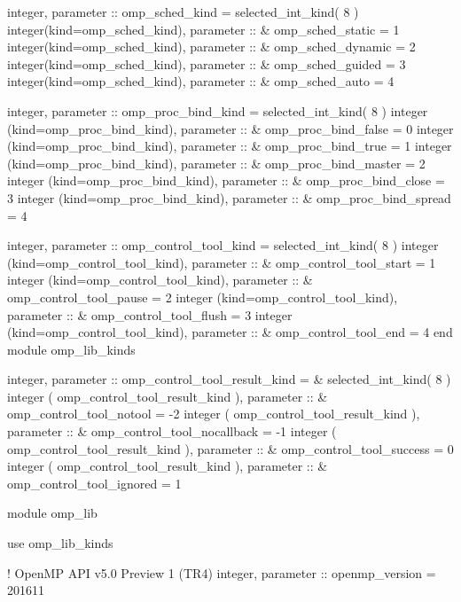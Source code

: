 {{\begin{codepar}
        integer, parameter :: omp\_sched\_kind = selected\_int\_kind( 8 ) 
        integer(kind=omp\_sched\_kind), parameter ::
      \&   omp\_sched\_static = 1
        integer(kind=omp\_sched\_kind), parameter ::
      \&   omp\_sched\_dynamic = 2
        integer(kind=omp\_sched\_kind), parameter ::
      \&   omp\_sched\_guided = 3
        integer(kind=omp\_sched\_kind), parameter ::
      \&   omp\_sched\_auto = 4
      
        integer, parameter :: omp\_proc\_bind\_kind = selected\_int\_kind( 8 )
        integer (kind=omp\_proc\_bind\_kind), parameter ::
      \&   omp\_proc\_bind\_false = 0
        integer (kind=omp\_proc\_bind\_kind), parameter ::
      \&   omp\_proc\_bind\_true = 1
        integer (kind=omp\_proc\_bind\_kind), parameter ::
      \&   omp\_proc\_bind\_master = 2
        integer (kind=omp\_proc\_bind\_kind), parameter ::
      \&   omp\_proc\_bind\_close = 3
        integer (kind=omp\_proc\_bind\_kind), parameter ::
      \&   omp\_proc\_bind\_spread = 4
\begin{samepage}
        integer, parameter :: omp\_control\_tool\_kind = selected\_int\_kind( 8 )
        integer (kind=omp\_control\_tool\_kind), parameter :: 
      \&   omp\_control\_tool\_start = 1
        integer (kind=omp\_control\_tool\_kind), parameter :: 
      \&   omp\_control\_tool\_pause = 2
        integer (kind=omp\_control\_tool\_kind), parameter :: 
      \&   omp\_control\_tool\_flush = 3
        integer (kind=omp\_control\_tool\_kind), parameter :: 
      \&   omp\_control\_tool\_end = 4
        end module omp\_lib\_kinds
\end{samepage}
\begin{samepage}
        integer, parameter :: omp\_control\_tool\_result\_kind = 
      \&   selected\_int\_kind( 8 )
        integer ( omp\_control\_tool\_result\_kind ), parameter :: 
      \&   omp_control_tool_notool = -2 
        integer ( omp\_control\_tool\_result\_kind ), parameter ::
      \&   omp_control_tool_nocallback = -1
        integer ( omp\_control\_tool\_result\_kind ), parameter ::
      \&   omp_control_tool_success = 0
        integer ( omp\_control\_tool\_result\_kind ), parameter ::
      \&   omp_control_tool_ignored = 1
\end{samepage}

        module omp\_lib

          use omp\_lib\_kinds

!                                     OpenMP API v5.0 Preview 1 (TR4)
          integer, parameter :: openmp\_version = 201611


\end{codepar}}}
